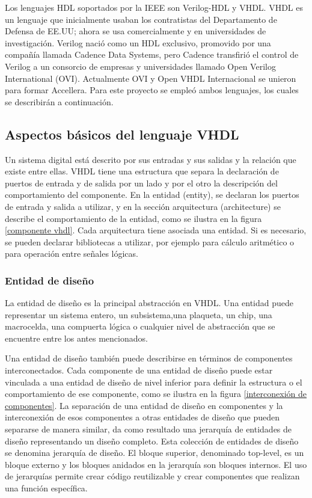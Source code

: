 Los lenguajes HDL soportados por la IEEE son Verilog-HDL y VHDL. VHDL es un lenguaje que inicialmente usaban los contratistas del Departamento de Defensa de EE.UU; ahora se usa comercialmente y en universidades de investigación. Verilog nació como un HDL exclusivo, promovido por una compañía llamada Cadence Data Systems, pero Cadence transfirió el control de Verilog a un consorcio de empresas y universidades llamado Open Verilog International (OVI). Actualmente OVI y Open VHDL Internacional se unieron para formar Accellera. Para este proyecto se empleó ambos lenguajes, los cuales se describirán a continuación.


\subsection{Aspectos básicos del lenguaje VHDL}
Un sistema digital está descrito por sus entradas y sus salidas y la relación que existe entre ellas. VHDL tiene una estructura que separa la declaración de puertos de entrada y de salida por un lado y por el otro la descripción del comportamiento del componente.
En la entidad (entity), se declaran los puertos de entrada y salida a utilizar, y en la sección arquitectura (architecture) se describe el comportamiento de la entidad, como se ilustra en la figura \ref{componente vhdl}. Cada arquitectura tiene asociada una entidad. Si es necesario, se pueden declarar bibliotecas a utilizar, por ejemplo para cálculo aritmético o para operación entre señales lógicas.

\subsubsection{Entidad de diseño}
La entidad de diseño es la principal abstracción en VHDL. Una entidad puede representar un sistema entero, un subsistema,una plaqueta, un chip, una macrocelda, una compuerta lógica o cualquier nivel de abstracción que se encuentre entre los antes mencionados.

Una entidad de diseño también puede describirse en términos de componentes interconectados. Cada componente de una entidad de diseño puede estar vinculada a una entidad de diseño de nivel inferior para definir la estructura o el comportamiento de ese componente, como se ilustra en la figura \ref{interconexión de componentes}. La separación de una entidad de diseño en componentes y la interconexión de esos componentes a otras entidades de diseño que pueden separarse de manera similar, da como resultado una jerarquía de entidades de diseño representando un diseño completo. Esta colección de entidades de diseño se denomina jerarquía de diseño. El bloque superior, denominado top-level, es un bloque externo y los bloques anidados en la jerarquía son bloques internos. El uso de jerarquías permite crear código reutilizable y crear componentes que realizan una función específica.

